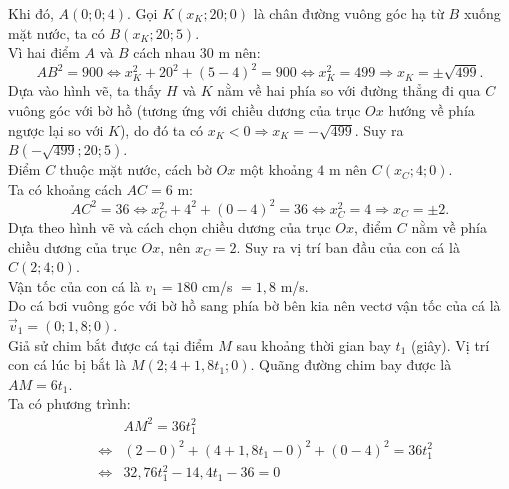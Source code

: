 \begin{ex}
{\begin{center}
		\end{center}
		Khi đó, $A(0;0;4)$. Gọi $K(x_K; 20; 0)$ là chân đường vuông góc hạ từ $B$ xuống mặt nước, ta có $B(x_K; 20; 5)$.\\
		Vì hai điểm $A$ và $B$ cách nhau $30$ m nên:
		\[AB^2 = 900 \Leftrightarrow x_K^2 + 20^2 + (5 - 4)^2 = 900 \Leftrightarrow x_K^2 = 499 \Rightarrow x_K = \pm\sqrt{499}.\]
		Dựa vào hình vẽ, ta thấy $H$ và $K$ nằm về hai phía so với đường thẳng đi qua $C$ vuông góc với bờ hồ (tương ứng với chiều dương của trục $Ox$ hướng về phía ngược lại so với $K$), do đó ta có $x_K < 0 \Rightarrow x_K = -\sqrt{499}$. Suy ra $B\left(-\sqrt{499};20;5\right)$.\\
		Điểm $C$ thuộc mặt nước, cách bờ $Ox$ một khoảng $4$ m nên $C(x_C;4;0)$.\\
		Ta có khoảng cách $AC = 6$ m:
		\[AC^2 = 36 \Leftrightarrow x_C^2 + 4^2 + (0 - 4)^2 = 36 \Leftrightarrow x_C^2 = 4 \Rightarrow x_C = \pm 2.\]
		Dựa theo hình vẽ và cách chọn chiều dương của trục $Ox$, điểm $C$ nằm về phía chiều dương của trục $Ox$, nên $x_C=2$. Suy ra vị trí ban đầu của con cá là $C(2;4;0)$.\\
		Vận tốc của con cá là $v_1 = 180$ cm/s $= 1{,}8$ m/s. \\
		Do cá bơi vuông góc với bờ hồ sang phía bờ bên kia nên vectơ vận tốc của cá là $\overrightarrow{v}_1 = (0;1{,}8;0)$.\\
		Giả sử chim bắt được cá tại điểm $M$ sau khoảng thời gian bay $t_1$ (giây). Vị trí con cá lúc bị bắt là $M(2;4 + 1{,}8t_1;0)$.
		Quãng đường chim bay được là $AM = 6t_1$.\\
		Ta có phương trình:
		\allowdisplaybreaks
		\begin{eqnarray*}
			&&AM^2 = 36t_1^2 \\
			&\Leftrightarrow& (2 - 0)^2 + (4 + 1{,}8t_1 - 0)^2 + (0 - 4)^2 = 36t_1^2 \\
			&\Leftrightarrow& 32{,}76t_1^2 - 14{,}4t_1 - 36 = 0 \\

\end{eqnarray*}}
\end{ex}
